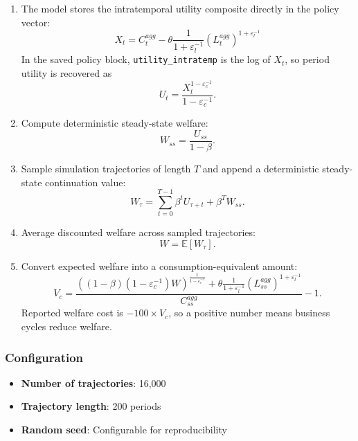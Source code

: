 \documentclass[11pt]{article}
\begin{document}
\begin{enumerate}
    \item The model stores the intratemporal utility composite directly in the policy vector:
    \begin{equation}
        X_t = C^{agg}_t - \theta \frac{1}{1 + \varepsilon_l^{-1}} (L^{agg}_t)^{1 + \varepsilon_l^{-1}}
    \end{equation}
    In the saved policy block, \texttt{utility\_intratemp} is the log of $X_t$, so period utility is recovered as
    \begin{equation}
        U_t = \frac{X_t^{1 - \varepsilon_c^{-1}}}{1 - \varepsilon_c^{-1}}.
    \end{equation}

    \item Compute deterministic steady-state welfare:
    \begin{equation}
        W_{ss} = \frac{U_{ss}}{1 - \beta}.
    \end{equation}

    \item Sample simulation trajectories of length $T$ and append a deterministic steady-state continuation value:
    \begin{equation}
        W_{\tau} = \sum_{t=0}^{T-1} \beta^t U_{\tau+t} + \beta^T W_{ss}.
    \end{equation}

    \item Average discounted welfare across sampled trajectories:
    \begin{equation}
        W = \mathbb{E}[W_{\tau}].
    \end{equation}

    \item Convert expected welfare into a consumption-equivalent amount:
    \begin{equation}
        V_c = \frac{\left((1-\beta)(1-\varepsilon_c^{-1})W\right)^{\frac{1}{1-\varepsilon_c^{-1}}}
        + \theta \frac{1}{1 + \varepsilon_l^{-1}} (L^{agg}_{ss})^{1 + \varepsilon_l^{-1}}}{C^{agg}_{ss}} - 1.
    \end{equation}
    Reported welfare cost is $-100 \times V_c$, so a positive number means business cycles reduce welfare.
\end{enumerate}

\subsubsection{Configuration}
\begin{itemize}
    \item \textbf{Number of trajectories}: 16,000
    \item \textbf{Trajectory length}: 200 periods
    \item \textbf{Random seed}: Configurable for reproducibility
\end{itemize}
\end{document}

